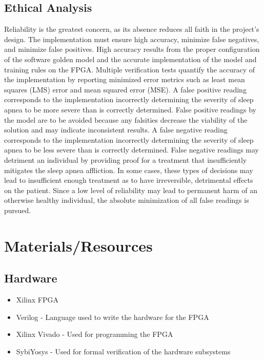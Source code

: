 \documentclass[12pt,titlepage]{article}
\begin{document}
\subsection{Ethical Analysis}
Reliability is the greatest concern, as its absence reduces all faith in the project’s design. The implementation must ensure high accuracy,
minimize false negatives, and minimize false positives. High accuracy results from the proper configuration of the software golden model and the
accurate implementation of the model and training rules on the FPGA. Multiple verification tests quantify the accuracy of the implementation by
reporting minimized error metrics such as least mean squares (LMS) error and mean squared error (MSE). A false positive reading corresponds to the
implementation incorrectly determining the severity of sleep apnea to be more severe than is correctly determined. False positive readings by the
model are to be avoided because any falsities decrease the viability of the solution and may indicate inconsistent results. A false negative
reading corresponds to the implementation incorrectly determining the severity of sleep apnea to be less severe than is correctly determined.
False negative readings may detriment an individual by providing proof for a treatment that insufficiently mitigates the sleep apnea affliction.
In some cases, these types of decisions may lead to insufficient enough treatment as to have irreversible, detrimental effects on the patient.
Since a low level of reliability may lead to permanent harm of an otherwise healthy individual, the absolute minimization of all false readings
is pursued. 

\section{Materials/Resources}
\subsection{Hardware}
\begin{itemize}
	\item Xilinx FPGA
	\item Verilog - Language used to write the hardware for the FPGA
	\item Xilinx Vivado - Used for programming the FPGA
	\item SybiYosys - Used for formal verification of the hardware subsystems
\end{itemize}	
\end{document}
